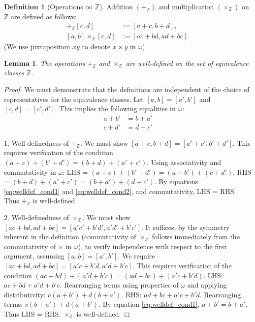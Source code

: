 \documentclass[11pt, a4paper]{article}
\theoremstyle{plain}
\newtheorem{lemma}[theorem]{Lemma}
\theoremstyle{definition}
\newtheorem{definition}[theorem]{Definition}
\numberwithin{equation}{section}
\newcommand{\Z}{\mathbb{Z}}
\begin{document}
\begin{definition}[Operations on $\Z$]\label{def:operations_Z}
Addition $(+_{\Z})$ and multiplication $(\times_{\Z})$ on $\Z$ are defined as follows:
\begin{align}
    [a, b] +_{\Z} [c, d] &:= [a+c, b+d], \label{eq:Z_add_def} \\
    [a, b] \times_{\Z} [c, d] &:= [ac+bd, ad+bc]. \label{eq:Z_mult_def}
\end{align}
(We use juxtaposition $xy$ to denote $x\times y$ in $\omega$).
\end{definition}

\begin{lemma}\label{lem:Z_ops_well_defined}
The operations $+_{\Z}$ and $\times_{\Z}$ are well-defined on the set of equivalence classes $\Z$.
\end{lemma}
\begin{proof}
We must demonstrate that the definitions are independent of the choice of representatives for the equivalence classes. Let $[a, b] = [a', b']$ and $[c, d] = [c', d']$. This implies the following equalities in $\omega$:
\begin{align}
    a+b' &= b+a' \label{eq:welldef_cond1} \\
    c+d' &= d+c' \label{eq:welldef_cond2}
\end{align}

1. Well-definedness of $+_{\Z}$. We must show $[a+c, b+d] = [a'+c', b'+d']$. This requires verification of the condition $(a+c)+(b'+d') = (b+d)+(a'+c')$.
Using associativity and commutativity in $\omega$:
LHS = $(a+c)+(b'+d') = (a+b')+(c+d')$.
RHS = $(b+d)+(a'+c') = (b+a')+(d+c')$.
By equations \eqref{eq:welldef_cond1} and \eqref{eq:welldef_cond2}, and commutativity, LHS = RHS. Thus $+_{\Z}$ is well-defined.

2. Well-definedness of $\times_{\Z}$. We must show $[ac+bd, ad+bc] = [a'c'+b'd', a'd'+b'c']$. It suffices, by the symmetry inherent in the definition (commutativity of $\times_{\Z}$ follows immediately from the commutativity of $\times$ in $\omega$), to verify independence with respect to the first argument, assuming $[a, b] = [a', b']$. We require $[ac+bd, ad+bc] = [a'c+b'd, a'd+b'c]$.
This requires verification of the condition $(ac+bd)+(a'd+b'c) = (ad+bc)+(a'c+b'd)$.
LHS: $ac+bd+a'd+b'c$. Rearranging terms using properties of $\omega$ and applying distributivity: $c(a+b') + d(b+a')$.
RHS: $ad+bc+a'c+b'd$. Rearranging terms: $c(b+a') + d(a+b')$.
By equation \eqref{eq:welldef_cond1}, $a+b'=b+a'$. Thus LHS = RHS. $\times_{\Z}$ is well-defined.
\end{proof}
\end{document}

